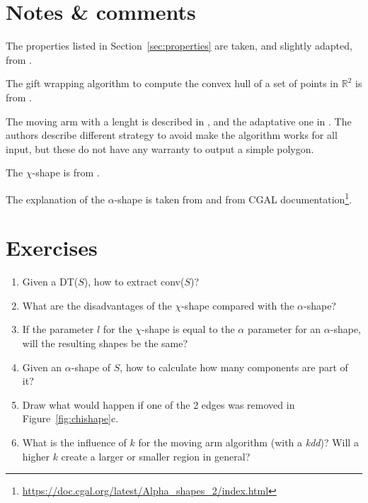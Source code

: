 %
\section{Notes \& comments}

The properties listed in Section~\ref{sec:properties} are taken, and slightly adapted, from \citet{Galton06}. 

The gift wrapping algorithm to compute the convex hull of a set of points in $\mathbb{R}^2$ is from \citet{Jarvis73}.

The moving arm with a lenght is described in \citet{Galton06}, and the adaptative one in \citet{Moreira07}.
The authors describe different strategy to avoid make the algorithm works for all input, but these do not have any warranty to output a simple polygon.

The $\chi$-shape is from \citet{Duckham08}.

The explanation of the $\alpha$-shape is taken from \citet{Edelsbrunner94} and from CGAL documentation\footnote{\url{https://doc.cgal.org/latest/Alpha_shapes_2/index.html}}.


%
\section{Exercises}

\begin{enumerate}
  \item Given a DT($S$), how to extract conv($S$)?
  \item What are the disadvantages of the $\chi$-shape compared with the $\alpha$-shape?
  \item If the parameter $l$ for the $\chi$-shape is equal to the $\alpha$ parameter for an $\alpha$-shape, will the resulting shapes be the same?
  \item Given an $\alpha$-shape of $S$, how to calculate how many components are part of it? 
  \item Draw what would happen if one of the 2 edges was removed in Figure~\ref{fig:chishape}c.
  \item What is the influence of $k$ for the moving arm algorithm (with a \emph{kdd})? Will a higher $k$ create a larger or smaller region in general?
\end{enumerate}


